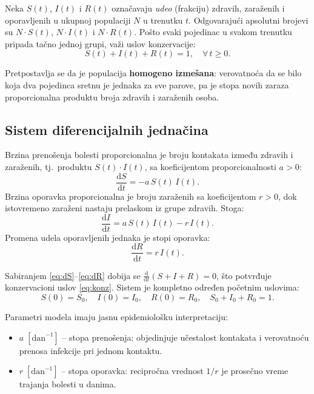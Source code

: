 \documentclass[12pt,a4paper]{article}
\begin{document}
	Neka $S(t)$, $I(t)$ i $R(t)$ označavaju \textit{udeo} (frakciju) zdravih, zaraženih i
	oporavljenih u ukupnoj populaciji $N$ u trenutku $t$. Odgovarajući apsolutni brojevi su
	$N\cdot S(t)$, $N\cdot I(t)$ i $N\cdot R(t)$. Pošto svaki pojedinac u svakom trenutku pripada
	tačno jednoj grupi, važi uslov konzervacije:
	\begin{equation}
		S(t) + I(t) + R(t) = 1, \quad \forall\, t \geq 0.
		\label{eq:konz}
	\end{equation}
	
	Pretpostavlja se da je populacija \textbf{homogeno izmešana}: verovatnoća da se bilo koja dva
	pojedinca sretnu je jednaka za sve parove, pa je stopa novih zaraza proporcionalna produktu
	broja zdravih i zaraženih osoba.
	
	\subsection{Sistem diferencijalnih jednačina}
	
	Brzina prenošenja bolesti proporcionalna je broju kontakata između zdravih i zaraženih, tj.\
	produktu $S(t)\cdot I(t)$, sa koeficijentom proporcionalnosti $a > 0$:
	\begin{equation}
		\frac{\mathrm{d}S}{\mathrm{d}t} = -a\,S(t)\,I(t).
		\label{eq:dS}
	\end{equation}
	Brzina oporavka proporcionalna je broju zaraženih sa koeficijentom $r > 0$, dok istovremeno
	zaraženi nastaju prelaskom iz grupe zdravih. Stoga:
	\begin{equation}
		\frac{\mathrm{d}I}{\mathrm{d}t} = a\,S(t)\,I(t) - r\,I(t).
		\label{eq:dI}
	\end{equation}
	Promena udela oporavljenih jednaka je stopi oporavka:
	\begin{equation}
		\frac{\mathrm{d}R}{\mathrm{d}t} = r\,I(t).
		\label{eq:dR}
	\end{equation}
	
	Sabiranjem \eqref{eq:dS}--\eqref{eq:dR} dobija se
	$\frac{\mathrm{d}}{\mathrm{d}t}(S+I+R)=0$,
	što potvrđuje konzervacioni uslov \eqref{eq:konz}. Sistem je kompletno određen početnim
	uslovima:
	\begin{equation}
		S(0) = S_0,\quad I(0) = I_0,\quad R(0) = R_0,
		\quad S_0+I_0+R_0 = 1.
		\label{eq:IC}
	\end{equation}
	
	Parametri modela imaju jasnu epidemiološku interpretaciju:
	\begin{itemize}
		\item $a\;[\mathrm{dan}^{-1}]$ -- stopa prenošenja: objedinjuje učestalost kontakata i
		verovatnoću prenosa infekcije pri jednom kontaktu.
		\item $r\;[\mathrm{dan}^{-1}]$ -- stopa oporavka: recipročna vrednost $1/r$ je prosečno
		vreme trajanja bolesti u danima.
	\end{itemize}
	
\end{document}
